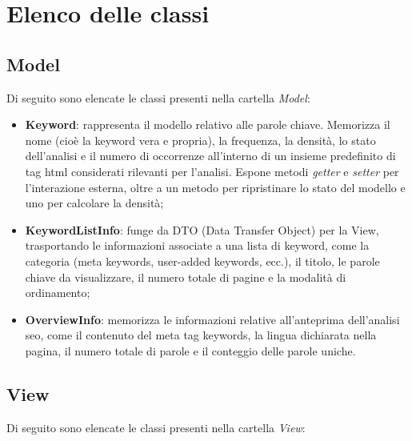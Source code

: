 \section{Elenco delle classi}
\label{sec:elenco-classi}

\subsection{Model}

\par Di seguito sono elencate le classi presenti nella cartella \textit{Model}:

\begin{itemize}
  \item \textbf{Keyword}: rappresenta il modello relativo alle parole chiave. Memorizza il nome (cioè la keyword vera e propria), la frequenza, la densità, lo stato dell’analisi e il numero di occorrenze all’interno di un insieme predefinito di tag \gls{html} considerati rilevanti per l’analisi. Espone metodi \textit{getter} e \textit{setter} per l’interazione esterna, oltre a un metodo per ripristinare lo stato del modello e uno per calcolare la densità;
  \item \textbf{KeywordListInfo}: funge da DTO (Data Transfer Object) per la View, trasportando le informazioni associate a una lista di keyword, come la categoria (meta keywords, user-added keywords, ecc.), il titolo, le parole chiave da visualizzare, il numero totale di pagine e la modalità di ordinamento;
  \item \textbf{OverviewInfo}: memorizza le informazioni relative all’anteprima dell’analisi \gls{seo}, come il contenuto del meta tag keywords, la lingua dichiarata nella pagina, il numero totale di parole e il conteggio delle parole uniche.
\end{itemize}

\subsection{View}

\par Di seguito sono elencate le classi presenti nella cartella \textit{View}:

